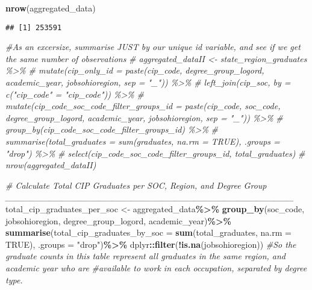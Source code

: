 \documentclass[
]{article}
\newenvironment{Shaded}{\begin{snugshade}}{\end{snugshade}}
\newcommand{\AttributeTok}[1]{\textcolor[rgb]{0.13,0.29,0.53}{#1}}
\newcommand{\CommentTok}[1]{\textcolor[rgb]{0.56,0.35,0.01}{\textit{#1}}}
\newcommand{\ConstantTok}[1]{\textcolor[rgb]{0.56,0.35,0.01}{#1}}
\newcommand{\FunctionTok}[1]{\textcolor[rgb]{0.13,0.29,0.53}{\textbf{#1}}}
\newcommand{\NormalTok}[1]{#1}
\newcommand{\OtherTok}[1]{\textcolor[rgb]{0.56,0.35,0.01}{#1}}
\newcommand{\SpecialCharTok}[1]{\textcolor[rgb]{0.81,0.36,0.00}{\textbf{#1}}}
\newcommand{\StringTok}[1]{\textcolor[rgb]{0.31,0.60,0.02}{#1}}
\begin{document}
\begin{Shaded}
\begin{Highlighting}[]
\FunctionTok{nrow}\NormalTok{(aggregated\_data)}
\end{Highlighting}
\end{Shaded}

\begin{verbatim}
## [1] 253591
\end{verbatim}

\begin{Shaded}
\begin{Highlighting}[]
\CommentTok{\#As an excersize, summarise JUST by our unique id variable, and see if we get the same number of observations}
\CommentTok{\# aggregated\_dataII \textless{}{-} state\_region\_graduates \%\textgreater{}\%}
\CommentTok{\#   mutate(cip\_only\_id = paste(cip\_code, degree\_group\_logord, academic\_year, jobsohioregion, sep = "\_")) \%\textgreater{}\%}
\CommentTok{\#   left\_join(cip\_soc, by = c("cip\_code" = "cip\_code")) \%\textgreater{}\% }
\CommentTok{\#     mutate(cip\_code\_soc\_code\_filter\_groups\_id = paste(cip\_code, soc\_code, degree\_group\_logord, academic\_year, jobsohioregion, sep = "\_")) \%\textgreater{}\% }
\CommentTok{\#   group\_by(cip\_code\_soc\_code\_filter\_groups\_id) \%\textgreater{}\%}
\CommentTok{\#   summarise(total\_graduates = sum(graduates, na.rm = TRUE), .groups = "drop") \%\textgreater{}\%}
\CommentTok{\#    select(cip\_code\_soc\_code\_filter\_groups\_id, total\_graduates)}
\CommentTok{\# nrow(aggregated\_dataII)}


\CommentTok{\# Calculate Total CIP Graduates per SOC, Region, and Degree Group \_\_\_\_\_\_\_\_\_\_\_\_\_\_\_\_\_\_\_\_\_\_\_\_\_\_\_\_\_\_\_\_\_\_\_\_\_\_\_\_\_\_\_\_\_\_}
\NormalTok{total\_cip\_graduates\_per\_soc }\OtherTok{\textless{}{-}}\NormalTok{ aggregated\_data}\SpecialCharTok{\%\textgreater{}\%}
  \FunctionTok{group\_by}\NormalTok{(soc\_code, jobsohioregion, degree\_group\_logord, academic\_year)}\SpecialCharTok{\%\textgreater{}\%}
   \FunctionTok{summarise}\NormalTok{(}\AttributeTok{total\_cip\_graduates\_by\_soc =} \FunctionTok{sum}\NormalTok{(total\_graduates, }\AttributeTok{na.rm =} \ConstantTok{TRUE}\NormalTok{), }\AttributeTok{.groups =} \StringTok{"drop"}\NormalTok{)}\SpecialCharTok{\%\textgreater{}\%}
\NormalTok{  dplyr}\SpecialCharTok{::}\FunctionTok{filter}\NormalTok{(}\SpecialCharTok{!}\FunctionTok{is.na}\NormalTok{(jobsohioregion))}
\CommentTok{\#So the graduate counts in this table represent all graduates in the same region, and academic year who are }
\CommentTok{\#available to work in each occupation, separated by degree type. }


\end{Highlighting}
\end{Shaded}
\end{document}
